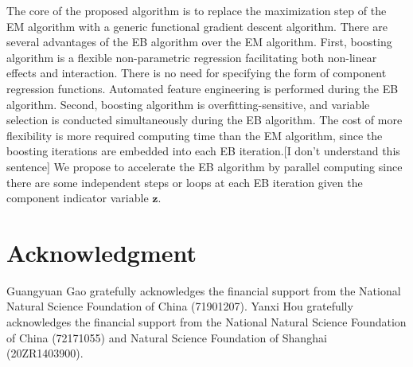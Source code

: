 \documentclass[11pt]{article}
\numberwithin{equation}{section}
\def\bz{\boldsymbol{z}}
\begin{document}
The core of the proposed algorithm is to replace the maximization step of the EM algorithm with a generic functional gradient descent algorithm.
There are several advantages of the EB algorithm over the EM algorithm. 
First, boosting algorithm is a flexible non-parametric regression facilitating both {non-linear effects and interaction}.  
There is no need for specifying the form of component regression functions.
Automated feature engineering is performed during the EB algorithm.
Second, boosting algorithm is {overfitting-sensitive}, and {variable selection} is conducted simultaneously during the EB algorithm.
The cost of more flexibility is more required computing time than the EM algorithm, since the boosting iterations are embedded into each EB iteration.{\color{blue}[I don't understand this sentence]}
We propose to accelerate the EB algorithm by parallel computing since there are some independent steps or loops at each EB iteration given the component indicator variable $\bz$.

	\section*{Acknowledgment}
Guangyuan Gao gratefully acknowledges the financial support from the National Natural Science Foundation of China (71901207). Yanxi Hou gratefully acknowledges the financial support from the National Natural Science Foundation of China (72171055) and Natural Science Foundation of Shanghai (20ZR1403900).



\end{document}
